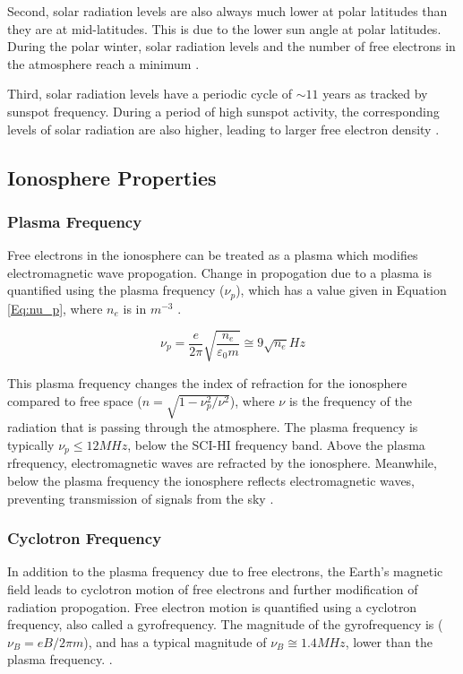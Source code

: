 Second, solar radiation levels are also always much lower at polar latitudes than they are at mid-latitudes. This is due to the lower sun angle at polar latitudes. During the polar winter, solar radiation levels and the number of free electrons in the atmosphere reach a minimum \cite{ionospheres}. 

Third, solar radiation levels have a periodic cycle of $\sim 11$ years as tracked by sunspot frequency. During a period of high sunspot activity, the corresponding levels of solar radiation are also higher, leading to larger free electron density \cite{ionospheres}. 


\subsection{Ionosphere Properties}

\subsubsection{Plasma Frequency}

Free electrons in the ionosphere can be treated as a plasma which modifies electromagnetic wave propogation. Change in propogation due to a plasma is quantified using the plasma frequency ($\nu_p$), which has a value given in Equation \ref{Eq:nu_p}, where $n_e$ is in $m^{-3}$ \cite{thompson_2001}. 

\begin{equation} \label{Eq:nu_p}
\nu_p = \frac{e}{2 \pi} \sqrt{\frac{n_e}{\varepsilon_0 m}} \cong 9 \sqrt{n_e} Hz
\end{equation}

This plasma frequency changes the index of refraction for the ionosphere compared to free space ($n = \sqrt{1-\nu_p^2/\nu^2}$), where $\nu$ is the frequency of the radiation that is passing through the atmosphere. The plasma frequency is typically $\nu_p \leq 12 MHz$, below the SCI-HI frequency band. Above the plasma rfrequency, electromagnetic waves are refracted by the ionosphere. Meanwhile, below the plasma frequency the ionosphere reflects electromagnetic waves, preventing transmission of signals from the sky \cite{thompson_2001}. 

\subsubsection{Cyclotron Frequency}

In addition to the plasma frequency due to free electrons, the Earth's magnetic field leads to cyclotron motion of free electrons and further modification of radiation propogation. Free electron motion is quantified using a cyclotron frequency, also called a gyrofrequency. The magnitude of the gyrofrequency is ($\nu_B = eB/2 \pi m$), and has a typical magnitude of $\nu_B \cong 1.4 MHz$, lower than the plasma frequency. \cite{thompson_2001}. 

